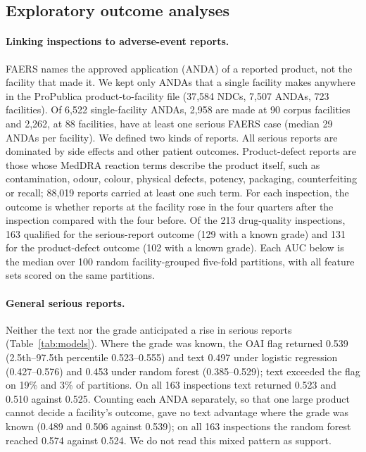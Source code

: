 \documentclass[12pt]{article}
\begin{document}

\subsection{Exploratory outcome analyses}
\label{sec:outcomes}

\paragraph{Linking inspections to adverse-event reports.} FAERS names the
approved application (ANDA) of a reported product, not the facility that
made it. We kept only ANDAs that a single facility makes anywhere in the
ProPublica product-to-facility file (37,584 NDCs, 7,507 ANDAs, 723
facilities). Of 6,522 single-facility ANDAs, 2,958 are made at 90 corpus
facilities and 2,262, at 88 facilities, have at least one serious FAERS
case (median 29 ANDAs per facility). We defined two kinds of reports. All
serious reports are dominated by side effects and other patient outcomes.
Product-defect reports are those whose MedDRA reaction terms describe the
product itself, such as contamination, odour, colour, physical defects,
potency, packaging, counterfeiting or recall; 88,019 reports carried at
least one such term. For each inspection, the outcome is whether reports at
the facility rose in the four quarters after the inspection compared with
the four before. Of the 213 drug-quality inspections, 163 qualified for the
serious-report outcome (129 with a known grade) and 131 for the
product-defect outcome (102 with a known grade). Each AUC below is the
median over 100 random facility-grouped five-fold partitions, with all
feature sets scored on the same partitions.

\paragraph{General serious reports.} Neither the text nor the grade
anticipated a rise in serious reports (Table~\ref{tab:models}). Where the
grade was known, the OAI flag returned 0.539 (2.5th--97.5th percentile
0.523--0.555) and text 0.497 under logistic regression (0.427--0.576) and
0.453 under random forest (0.385--0.529); text exceeded the flag on 19\%
and 3\% of partitions. On all 163 inspections text returned 0.523 and
0.510 against 0.525. Counting each ANDA separately, so that one large
product cannot decide a facility's outcome, gave no text advantage where
the grade was known (0.489 and 0.506 against 0.539); on all 163
inspections the random forest reached 0.574 against 0.524. We do not read
this mixed pattern as support.
\end{document}
